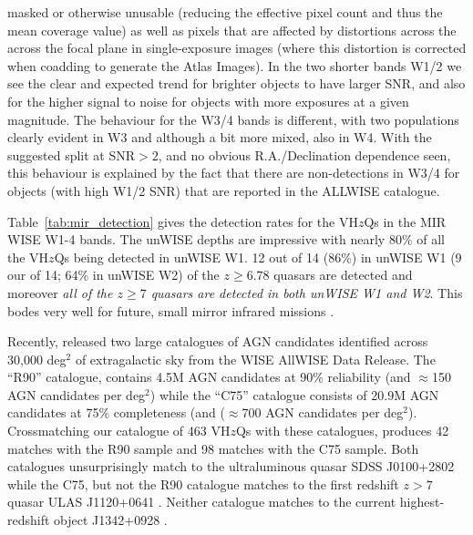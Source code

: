 \documentclass[usenatbib]{mnras}
\begin{document}
masked or otherwise unusable (reducing the effective pixel count and
thus the mean coverage value) as well as pixels that are affected by
distortions across the across the focal plane in single-exposure
images (where this distortion is corrected when coadding to generate
the Atlas Images). 
In the two shorter bands W1/2 we see the clear and expected
trend for brighter objects to have larger SNR, and also for the higher
signal to noise for objects with more exposures at a given
magnitude. The behaviour for the W3/4 bands is different, with two
populations clearly evident in W3 and although a bit more mixed, also
in W4. With the suggested split at SNR$>2$, and no obvious
R.A./Declination dependence seen, this behaviour is explained by the
fact that there are non-detections in W3/4 for objects (with high W1/2
SNR) that are reported in the ALLWISE catalogue.

Table~\ref{tab:mir_detection} gives the detection rates for the
VH$z$Qs in the MIR WISE W1-4 bands. The unWISE depths are impressive
with nearly 80\% of all the VH$z$Qs being detected in unWISE W1. 12
out of 14 (86\%) in unWISE W1 (9 our of 14; 64\% in unWISE W2) of the
$z\geq6.78$ quasars are detected and moreover {\it all of the $z\geq7$
quasars are detected in both unWISE W1 and W2}. This bodes very well
for future, small mirror infrared missions \citep[e.g.][]{NEOCam_WP}.

Recently, \citet{Assef2018} released two large catalogues of AGN
candidates identified across 30,000 deg$^2$ of extragalactic sky from
the WISE AllWISE Data Release. The ``R90'' catalogue, contains 4.5M
AGN candidates at 90\% reliability (and $\approx$150 AGN candidates
per deg$^2$) while the ``C75'' catalogue consists of 20.9M AGN
candidates at 75\% completeness (and ($\approx$700 AGN candidates per
deg$^2$). Crossmatching our catalogue of 463 VH$z$Qs with these
catalogues, produces 42 matches with the R90 sample and 98 matches
with the C75 sample. Both catalogues unsurprisingly match to the
ultraluminous quasar SDSS J0100+2802 \citep{Wu2015} while the C75, but
not the R90 catalogue matches to the first redshift $z>7$ quasar ULAS
J1120+0641 \citep{Mortlock2011}. Neither catalogue matches to the
current highest-redshift object J1342+0928 \citep{Banados2018}.
\end{document}
